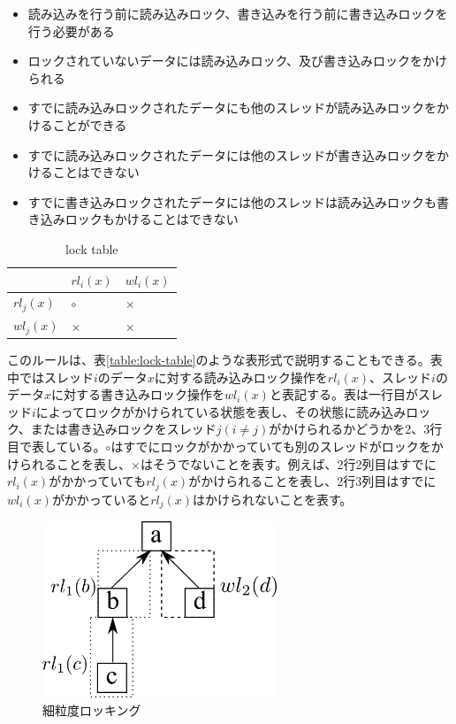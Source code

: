 \documentclass[a4paper]{jreport}	%
\begin{document}
\begin{itemize}
 \item 読み込みを行う前に読み込みロック、書き込みを行う前に書き込みロックを行う必要がある
 \item ロックされていないデータには読み込みロック、及び書き込みロックをかけられる
 \item すでに読み込みロックされたデータにも他のスレッドが読み込みロックをかけることができる
 \item すでに読み込みロックされたデータには他のスレッドが書き込みロックをかけることはできない
 \item すでに書き込みロックされたデータには他のスレッドは読み込みロックも書き込みロックもかけることはできない
\end{itemize}


\begin{table}[h!]
\centering
\begin{tabular}{ | m{1cm} | m{1cm} | m{1cm} | } 
  \hline
  & $rl_i(x)$ & $wl_i(x)$ \\ 
  \hline
  $rl_j(x)$ & $\circ$ & $\times$ \\ 
  \hline
  $wl_j(x)$ &  $\times$ & $\times$ \\ 
  \hline
\end{tabular}	
\caption{lock table}
\label{table:各ロックの互換性}
\end{table}


このルールは、表\ref{table:lock-table}のような表形式で説明することもできる。表中ではスレッド$i$のデータ$x$に対する読み込みロック操作を$rl_i(x)$、スレッド$i$のデータ$x$に対する書き込みロック操作を$wl_i(x)$と表記する。表は一行目がスレッド$i$によってロックがかけられている状態を表し、その状態に読み込みロック、または書き込みロックをスレッド$j(i \neq j)$がかけられるかどうかを2、3行目で表している。$\circ$はすでにロックがかかっていても別のスレッドがロックをかけられることを表し、$\times$はそうでないことを表す。例えば、2行2列目はすでに$rl_i(x)$がかかっていても$rl_j(x)$がかけられることを表し、2行3列目はすでに$wl_i(x)$がかかっていると$rl_j(x)$はかけられないことを表す。

\begin{figure}[h] 
\centering
\includegraphics[width=7cm]{high-gran-lock}
\caption{細粒度ロッキング}
\label{fig:high-gran-lock}
\end{figure}
\end{document}
